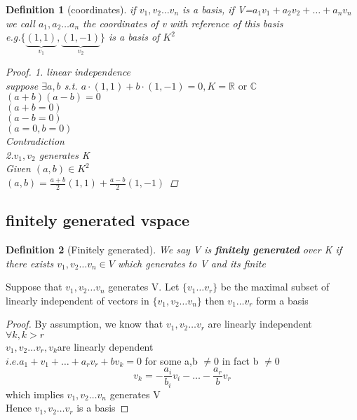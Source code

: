 \documentclass{article}
\newtheorem*{definition}{Definition}
\newcommand{\R}{\mathbb{R}}
\newcommand{\C}{\mathbb{C}}
\newcommand{\cd}{\cdot}
\newcommand{\as}{a_1,a_2\dots a_n}
\newcommand{\vs}{v_1,v_2\dots v_n}
\newcommand{\lincom}{a_1v_1+a_2v_2+\dots+a_nv_n}
\newcommand{\vr}{v_1,v_2\dots v_r}
\newenvironment{corollary}[2][Corollary]{\begin{trivlist}
\item[\hskip \labelsep {\bfseries #1}\hskip \labelsep {\bfseries #2.}]}{\end{trivlist}}
\begin{document}
\begin{definition}
    [coordinates] if $\vs$ is a basis, if V=$\lincom$\\ we call $\as$ the coordinates of v with reference of this basis\\
    e.g.$\{\underbrace{(1,1)}_{v_1},\underbrace{(1,-1)}_{v_2}\}$ is a basis of $K^2$
    \begin{proof}
        1. linear independence\\
        suppose  $\exists a,b$ s.t. $a\cd (1,1)+b\cd(1,-1)=0, K=\R \text{ or } \C$\\
        $(a+b)(a-b)=0$\\$(a+b=0)$\\$(a-b=0)$\\$(a=0,b=0)$\\Contradiction \lightning
        \\2.$v_1,v_2 $ generates K\\
        Given $(a,b) \in K^2$\\
        $(a,b)=\frac{a+b}{2}(1,1)+\frac{a-b}{2}(1,-1)$
    \end{proof}
\end{definition}

\subsection{finitely generated vspace}
\begin{definition}
    [Finitely generated] We say V is \textbf{ finitely generated } over K if there exists $\vs \in V$ which generates to V and its finite\\ 
\end{definition}
\begin{theorem}
    [] Suppose that $\vs$ generates V. Let $\{v_1\dots v_r \}$ be the maximal subset of linearly independent of vectors in $\{\vs \}$ then $v_1\dots v_r$ form a basis
\end{theorem}
\begin{proof}
    By assumption, we know that $\vr$ are linearly independent\\
    $\forall k, k>r$\\ $\vr,v_k$are linearly dependent\\
    $i.e. a_1+v_1+\dots+a_rv_r+bv_k=0$ for some a,b $\neq 0$ in fact b $\not =0$ \\
    $$v_k=-\frac{a_i}{b_i}v_i-\dots-\frac{a_r}{b}v_r$$
 which implies $\vs$ generates V \\Hence $\vr$ is a basis
    
\end{proof}
\end{document}
